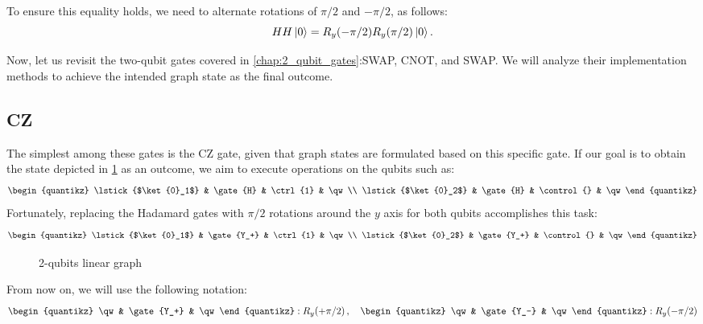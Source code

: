 To ensure this equality holds, we need to alternate rotations of $\pi /2$ and $-\pi / 2$, as follows:
\begin{equation}
    H H \ket{0} =
    R_y(- \pi / 2) R_y(\pi / 2) \ket{0} .
\end{equation}

Now, let us revisit the two-qubit gates covered in \cref{chap:2_qubit_gates}:SWAP, CNOT, and SWAP.
We will analyze their implementation methods to achieve the intended graph state as the final outcome.

\subsection{CZ}

The simplest among these gates is the CZ gate, given that graph states are formulated based on this specific gate. 
If our goal is to obtain the state depicted in \cref{fig:CZ_graph} as an outcome, we aim to execute operations on the qubits such as:
\begin{equation}
    \begin{quantikz}
      \lstick{$\ket{0}_1$} & \gate{H} & \ctrl{1} & \qw \\
      \lstick{$\ket{0}_2$} & \gate{H} & \control{} & \qw
    \end{quantikz}
\end{equation}
Fortunately, replacing the Hadamard gates with $\pi/2$ rotations around the $y$ axis for both qubits accomplishes this task:
\begin{equation}
    \begin{quantikz}
      \lstick{$\ket{0}_1$} & \gate{Y_+} & \ctrl{1} & \qw \\
      \lstick{$\ket{0}_2$} & \gate{Y_+} & \control{} & \qw
    \end{quantikz}
\end{equation}

\begin{figure}
    \centering
    
    \vspace{-1cm}
    \caption{2-qubits linear graph}
    \label{fig:CZ_graph}
\end{figure}

From now on, we will use the following notation:
\begin{equation*}
    \begin{quantikz}
        \qw & \gate{Y_+} & \qw
    \end{quantikz}
    : R_y(+\pi/2) \, , \quad
    \begin{quantikz}
        \qw & \gate{Y_-} & \qw
    \end{quantikz}
    : R_y(-\pi/2)
\end{equation*}

